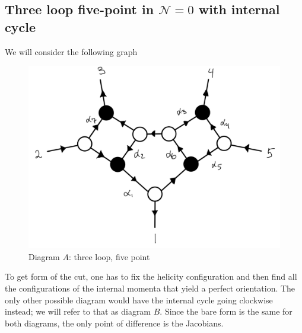 \documentclass[letter,11pt]{article}
\begin{document}
\subsection{Three loop five-point in $\mathcal{N}=0$ with internal cycle}
We will consider the following graph
\begin{figure}[H]
	\centering
	\includegraphics[width=0.5\linewidth]{5pt3l_2}
	\caption{Diagram $A$: three loop, five point}
	\label{fig:5pt3l_3}
\end{figure}
To get form of the cut, one has to fix the helicity configuration and then find all the configurations of the internal momenta that yield a perfect orientation. The only other possible diagram would have the internal cycle going clockwise instead; we will refer to that as diagram $B$. Since the bare form is the same for both diagrams, the only point of difference is the Jacobians. 
\end{document}
